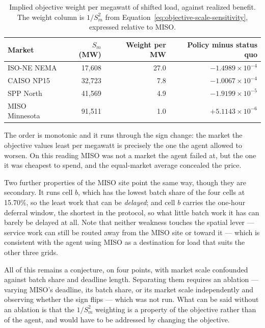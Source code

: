 ﻿\documentclass[12pt]{article}
\begin{document}
\begin{table}[htbp]
  \centering
  \small
  \caption{Implied objective weight per megawatt of shifted load, against
  realized benefit. The weight column is \(1/S_m^{2}\) from
  Equation~\eqref{eq:objective-scale-sensitivity}, expressed relative to MISO.}
  \label{tab:market-weighting}
  \begin{tabular}{@{}lrrr@{}}
    \toprule
    Market & \(S_m\) (MW) & Weight per MW & Policy minus status quo \\
    \midrule
    ISO-NE NEMA    & 17,608 & 27.0 & \(-1.4989\times10^{-4}\) \\
    CAISO NP15     & 32,723 &  7.8 & \(-1.0067\times10^{-4}\) \\
    SPP North      & 41,569 &  4.9 & \(-1.9199\times10^{-5}\) \\
    MISO Minnesota & 91,511 &  1.0 & \(+5.1143\times10^{-6}\) \\
    \bottomrule
  \end{tabular}
\end{table}

The order is monotonic and it runs through the sign change: the market the
objective values least per megawatt is precisely the one the agent allowed to
worsen. On this reading MISO was not a market the agent failed at, but the one
it was cheapest to spend, and the equal-market average concealed the price.

Two further properties of the MISO site point the same way, though they are
secondary. It runs cell \(b\), which has the lowest batch share of the four
cells at 15.70\%, so the least work that can be \emph{delayed}; and cell \(b\)
carries the one-hour deferral window, the shortest in the protocol, so what
little batch work it has can barely be delayed at all. Note that neither
weakness touches the spatial lever --- service work can still be routed away
from the MISO site or toward it --- which is consistent with the agent using
MISO as a destination for load that suits the other three grids.

All of this remains a conjecture, on four points, with market scale confounded
against batch share and deadline length. Separating them requires an ablation
--- varying MISO's deadline, its batch share, or its market scale independently
and observing whether the sign flips --- which was not run. What can be said
without an ablation is that the \(1/S_m^{2}\) weighting is a property of the
objective rather than of the agent, and would have to be addressed by changing
the objective.
\end{document}
